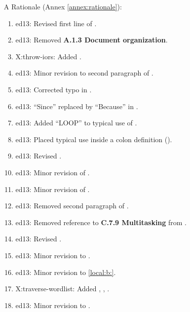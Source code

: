 \begin{itemize}
	\item[A] Rationale (Annex \ref{annex:rationale}):				%
		\begin{enumerate}
		\item \textsf{ed13}: Revised first line of .
		\item \textsf{ed13}: Removed \textbf{A.1.3 Document organization}.
		\item \textsf{X:throw-iors}: Added .
		\item \textsf{ed13}: Minor revision to second paragraph of .
		\item \textsf{ed13}: Corrected typo in .
		\item \textsf{ed13}: ``Since'' replaced by ``Because'' in .
		\item \textsf{ed13}: Added ``LOOP'' to typical use of .
		\item \textsf{ed13}: Placed typical use inside a colon definition ().
		\item \textsf{ed13}: Revised .
		\item \textsf{ed13}: Minor revision of .
		\item \textsf{ed13}: Minor revision of .
		\item \textsf{ed13}: Removed second paragraph of .
		\item \textsf{ed13}: Removed reference to \textbf{C.7.9 Multitasking} from .

		\item \textsf{ed13}: Revised .

		\item \textsf{ed13}: Minor revision to .

		\item \textsf{ed13}: Minor revision to \ref{local:b:}{}.

		\item \textsf{X:traverse-wordlist}:
			Added ,
			,
			.

		\item \textsf{ed13}: Minor revision to .
		\end{enumerate}


\end{itemize}
